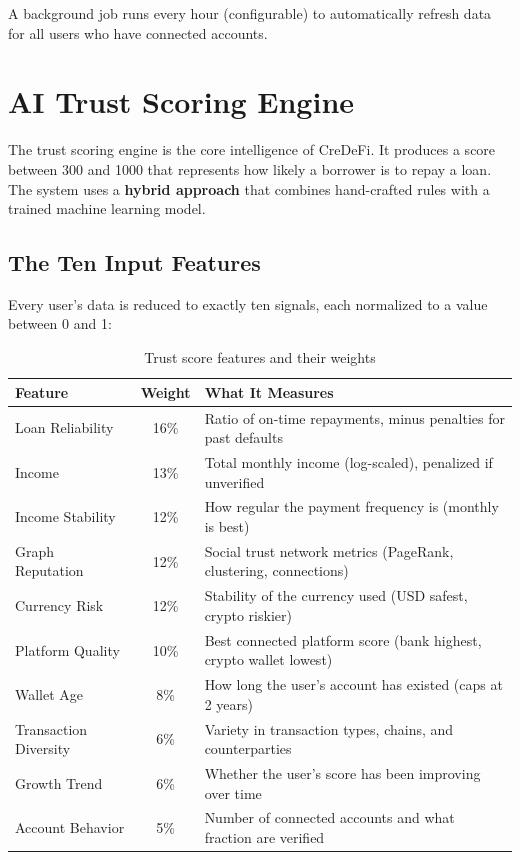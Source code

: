 \documentclass[12pt, a4paper]{article}
\begin{document}
A background job runs every hour (configurable) to automatically refresh data for all users who have connected accounts.


\section{AI Trust Scoring Engine}

The trust scoring engine is the core intelligence of CreDeFi. It produces a score between 300 and 1000 that represents how likely a borrower is to repay a loan. The system uses a \textbf{hybrid approach} that combines hand-crafted rules with a trained machine learning model.

\subsection{The Ten Input Features}

Every user's data is reduced to exactly ten signals, each normalized to a value between 0 and 1:

\begin{table}[H]
\centering
\caption{Trust score features and their weights}
\begin{tabularx}{\textwidth}{l c X}
\toprule
\textbf{Feature} & \textbf{Weight} & \textbf{What It Measures} \\
\midrule
Loan Reliability & 16\% & Ratio of on-time repayments, minus penalties for past defaults \\
Income & 13\% & Total monthly income (log-scaled), penalized if unverified \\
Income Stability & 12\% & How regular the payment frequency is (monthly is best) \\
Graph Reputation & 12\% & Social trust network metrics (PageRank, clustering, connections) \\
Currency Risk & 12\% & Stability of the currency used (USD safest, crypto riskier) \\
Platform Quality & 10\% & Best connected platform score (bank highest, crypto wallet lowest) \\
Wallet Age & 8\% & How long the user's account has existed (caps at 2 years) \\
Transaction Diversity & 6\% & Variety in transaction types, chains, and counterparties \\
Growth Trend & 6\% & Whether the user's score has been improving over time \\
Account Behavior & 5\% & Number of connected accounts and what fraction are verified \\
\bottomrule
\end{tabularx}
\end{table}
\end{document}
